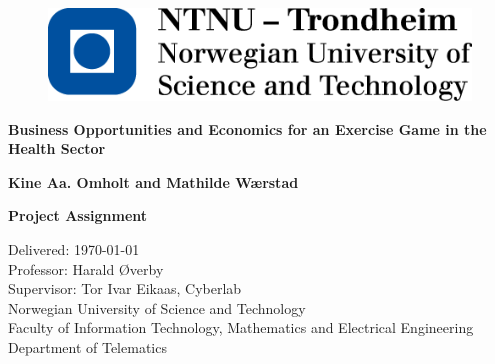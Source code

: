 \documentclass[b5paper,twoside,openright,11pt]{report}
\begin{document}
\begin{flushleft}
\begin{figure}[htb]
\includegraphics[scale=0.6]{NTNU-logo}
\end{figure}
\bigskip
\bigskip
\bigskip
\bigskip
\begin{huge}
\textbf{Business Opportunities and Economics for an Exercise Game in the Health Sector}\\
\end{huge} 
\bigskip
\bigskip
\bigskip
\bigskip
\bigskip
\bigskip
\bigskip
\begin{Large}
\textbf{Kine Aa. Omholt and Mathilde Wærstad \\}
\end{Large}
\bigskip
\bigskip
\bigskip
\bigskip
\bigskip
\bigskip
\begin{large}
\textbf{Project Assignment\\}
\end{large}
Delivered: \today\\
Professor: Harald Øverby\\
Supervisor: Tor Ivar Eikaas, Cyberlab\\
\bigskip
\bigskip
\bigskip
\bigskip
\bigskip
Norwegian University of Science and Technology\\ 
Faculty of Information Technology, Mathematics and Electrical Engineering\\
Department of Telematics
\end{flushleft}
\cleardoublepage
\end{document}
